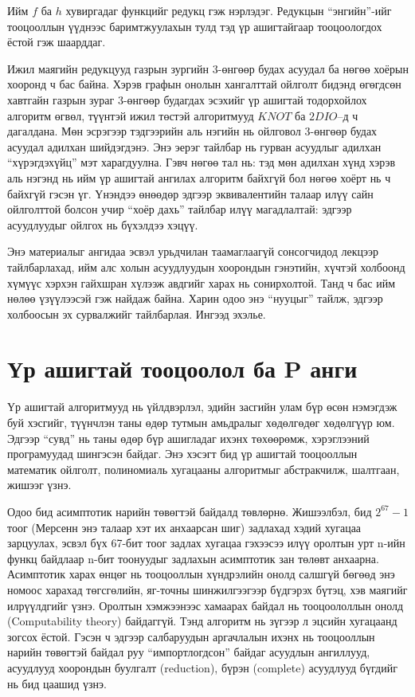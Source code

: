 Ийм $f$ ба $h$ хувиргадаг функцийг редукц гэж нэрлэдэг. Редукцын “энгийн”-ийг тооцооллын үүднээс баримтжуулахын тулд тэд үр ашигтайгаар тооцоологдох ёстой гэж шаарддаг.


Ижил маягийн редукцууд газрын зургийн 3-өнгөөр будах асуудал ба нөгөө хоёрын хооронд ч бас байна. Хэрэв графын онолын хангалттай ойлголт бидэнд өгөгдсөн хавтгайн газрын зураг 3-өнгөөр будагдах эсэхийг үр ашигтай тодорхойлох алгоритм өгвөл, түүнтэй ижил төстэй алгоритмууд $KNOT$ ба $2DIO$–д ч дагалдана. Мөн эсрэгээр тэдгээрийн аль нэгийн нь ойлговол 3-өнгөөр будах асуудал адилхан шийдэгдэнэ. Энэ эерэг тайлбар нь гурван асуудлыг адилхан “хүрэгдэхүйц” мэт харагдуулна. Гэвч нөгөө тал нь: тэд мөн адилхан хүнд хэрэв аль нэгэнд нь ийм үр ашигтай ангилах алгоритм байхгүй бол нөгөө хоёрт нь ч байхгүй гэсэн үг. Үнэндээ өнөөдөр эдгээр эквивалентийн талаар илүү сайн ойлголттой болсон учир “хоёр дахь” тайлбар илүү магадлалтай: эдгээр асуудлуудыг ойлгох нь бүхэлдээ хэцүү.


Энэ материалыг ангидаа эсвэл урьдчилан таамаглаагүй сонсогчидод лекцээр тайлбарлахад, ийм алс холын асуудлуудын хоорондын гэнэтийн, хүчтэй холбоонд хүмүүс хэрхэн гайхшран хүлээж авдгийг харах нь сонирхолтой. Танд ч бас ийм нөлөө үзүүлээсэй гэж найдаж байна. Харин одоо энэ “нууцыг” тайлж, эдгээр холбоосын эх сурвалжийг тайлбарлая. Ингээд эхэлье.


\section{Үр ашигтай тооцоолол ба P анги}


Үр ашигтай алгоритмууд нь үйлдвэрлэл, эдийн засгийн улам бүр өсөн нэмэгдэж буй хэсгийг, түүнчлэн таны өдөр тутмын амьдралыг хөдөлгөдөг хөдөлгүүр юм. Эдгээр “сувд” нь таны өдөр бүр ашигладаг ихэнх төхөөрөмж, хэрэглээний програмуудад шингэсэн байдаг. Энэ хэсэгт бид үр ашигтай тооцооллын математик ойлголт, полиномиаль хугацааны алгоритмыг абстракчилж, шалтгаан, жишээг үзнэ.


Одоо бид асимптотик нарийн төвөгтэй байдалд төвлөрнө. Жишээлбэл, бид $2^67 − 1$ тоог (Мерсенн энэ талаар хэт их анхаарсан шиг) задлахад хэдий хугацаа зарцуулах, эсвэл бүх 67-бит тоог задлах хугацаа гэхээсээ илүү оролтын урт n-ийн функц байдлаар n-бит тоонуудыг задлахын асимптотик зан төлөвт анхаарна. Асимптотик харах өнцөг нь тооцооллын хүндрэлийн онолд салшгүй бөгөөд энэ номоос харахад төгсгөлийн, яг-точны шинжилгээгээр бүдгэрэх бүтэц, хэв маягийг илрүүлдгийг үзнэ. Оролтын хэмжээнээс хамаарах байдал нь тооцоололлын онолд (Computability theory) байдаггүй. Тэнд алгоритм нь зүгээр л эцсийн хугацаанд зогсох ёстой. Гэсэн ч эдгээр салбаруудын аргачлалын ихэнх нь тооцооллын нарийн төвөгтэй байдал руу “импортлогдсон” байдаг асуудлын ангиллууд, асуудлууд хоорондын буулгалт (reduction), бүрэн (complete) асуудлууд бүгдийг нь бид цаашид үзнэ.


